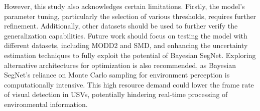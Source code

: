 However, this study also acknowledges certain limitations. Firstly, the model's parameter tuning, particularly 
the selection of various thresholds, requires further refinement. Additionally, other datasets should be used to 
further verify the generalization capabilities. Future work should focus on testing the model with different datasets, 
including MODD2 and SMD, and enhancing the uncertainty estimation techniques to fully exploit the potential of 
Bayesian SegNet. Exploring alternative architectures for optimization is also recommended, as Bayesian SegNet's 
reliance on Monte Carlo sampling for environment perception is computationally intensive. This high resource 
demand could lower the frame rate of visual detection in USVs, potentially hindering real-time processing of 
environmental information.